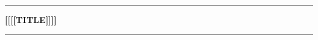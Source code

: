 \documentclass[12pt, letterpaper]{article}
\begin{document}
\vspace{0.5cm}
\hrule
\vspace{0.5cm}
\begin{center}
    {\Large \textbf{[[[[TITLE]]]]}}
\end{center}
\vspace{0.5cm}
\hrule
\vspace{0.5cm}
\end{document}
